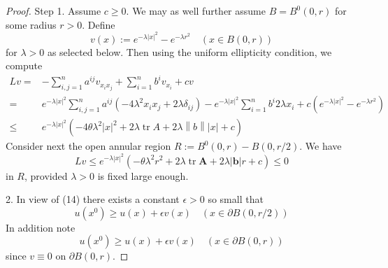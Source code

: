 \begin{theorem}
    \begin{proof}
        Step 1.
        Assume $c \geq 0$. We may as well further assume $B=B^0(0, r)$ for some radius $r>0$. Define
        \begin{equation*}
            v(x):=e^{-\lambda|x|^2}-e^{-\lambda r^2} \quad(x \in B(0, r))
        \end{equation*}
        for $\lambda>0$ as selected below. Then using the uniform ellipticity condition, we compute
        \begin{equation*}
            \begin{aligned}
                L v= & -\sum_{i, j=1}^n a^{i j} v_{x_i x_j}+\sum_{i=1}^n b^i v_{x_i}+c v                                                                                                                                    \\
                =    & e^{-\lambda|x|^2} \sum_{i, j=1}^n a^{i j}\left(-4 \lambda^2 x_i x_j+2 \lambda \delta_{i j}\right) -e^{-\lambda|x|^2} \sum_{i=1}^n b^i 2 \lambda x_i+c\left(e^{-\lambda|x|^2}-e^{-\lambda r^2}\right) \\
                \leq & e^{-\lambda|x|^2}\left(-4 \theta \lambda^2|x|^2+2 \lambda \operatorname{tr} A +2 \lambda \left\| b \right\| \left|x\right|+c\right)
            \end{aligned}
        \end{equation*}
        Consider next the open annular region $R:=B^0(0, r)-B(0, r / 2)$. We have
        \begin{equation*}
            L v \leq e^{-\lambda|x|^2}\left(-\theta \lambda^2 r^2+2 \lambda \operatorname{tr} \mathbf{A}+2 \lambda|\mathbf{b}| r+c\right) \leq 0
        \end{equation*}
        in $R$, provided $\lambda>0$ is fixed large enough.

        2. In view of (14) there exists a constant $\epsilon>0$ so small that
        \begin{equation*}
            u\left(x^0\right) \geq u(x)+\epsilon v(x) \quad(x \in \partial B(0, r / 2))
        \end{equation*}
        In addition note
        \begin{equation*}
            u\left(x^0\right) \geq u(x)+\epsilon v(x) \quad(x \in \partial B(0, r))
        \end{equation*}
        since $v \equiv 0$ on $\partial B(0, r)$.


\end{proof}
\end{theorem}
